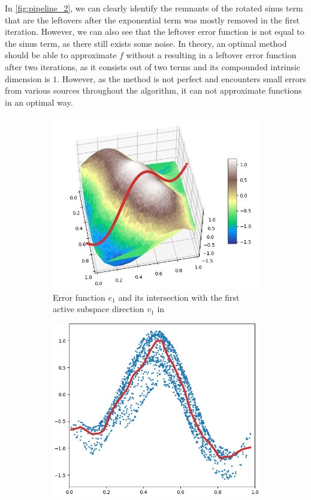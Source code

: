 \documentclass[
  a4paper,  %
  twoside,  %
  bibliography=totoc,
  headsepline,
  cleardoublepage=empty,
  parskip=half,
  draft=false
]{scrbook}
\begin{document}
%
In \cref{fig:pipeline_2}, we can clearly identify the remnants of the rotated sinus term that are the leftovers after the exponential term was mostly removed in the first iteration.
However, we can also see that the leftover error function is not equal to the sinus term, as there still exists some noise.
In theory, an optimal method should be able to approximate $f$ without a resulting in a leftover error function after two iterations, as it consists out of two terms and its compounded intrinsic dimension is $1$.
However, as the method is not perfect and encounters small errors from various sources throughout the algorithm, it can not approximate functions in an optimal way.
\begin{mdframed}[style=style]
\begin{figure}[H]
\begin{subfigure}{.5\textwidth}
  \centering
  \includegraphics[width=.8\linewidth]{graphics/pipeline_current_2.png}
  \caption{Error function $e_1$ and its intersection with the first active subspace direction $v_1$ in \reddot}
\label{fig:pipeline_current_2}
\end{subfigure}%
\begin{subfigure}{.5\textwidth}
  \centering
  \includegraphics[width=.8\linewidth]{graphics/pipeline_local_2.png}

\end{subfigure}
\end{figure}
\end{mdframed}
\end{document}

